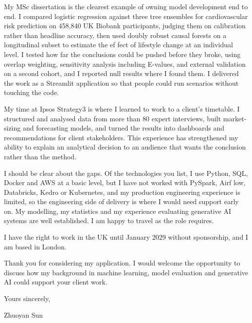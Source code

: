\documentclass[letterpaper,11pt]{article}
\begin{document}
My MSc dissertation is the clearest example of owning model development end to end. I compared logistic regression against three tree ensembles for cardiovascular risk prediction on 458,840 UK Biobank participants, judging them on calibration rather than headline accuracy, then used doubly robust causal forests on a longitudinal subset to estimate the ef\kern0pt fect of lifestyle change at an individual level. I tested how far the conclusions could be pushed before they broke, using overlap weighting, sensitivity analysis including E-values, and external validation on a second cohort, and I reported null results where I found them. I delivered the work as a Streamlit application so that people could run scenarios without touching the code.

My time at Ipsos Strategy3 is where I learned to work to a client's timetable. I structured and analysed data from more than 80 expert interviews, built market-sizing and forecasting models, and turned the results into dashboards and recommendations for client stakeholders. This experience has strengthened my ability to explain an analytical decision to an audience that wants the conclusion rather than the method.

I should be clear about the gaps. Of the technologies you list, I use Python, SQL, Docker and AWS at a basic level, but I have not worked with PySpark, Airf\kern0pt low, Databricks, Kedro or Kubernetes, and my production engineering experience is limited, so the engineering side of delivery is where I would need support early on. My modelling, my statistics and my experience evaluating generative AI systems are well established. I am happy to travel as the role requires.

I have the right to work in the UK until January 2029 without sponsorship, and I am based in London.

Thank you for considering my application. I would welcome the opportunity to discuss how my background in machine learning, model evaluation and generative AI could support your client work.

\vspace{2pt}
Yours sincerely,

\vspace{8pt}
Zhuoyan Sun
\end{document}
